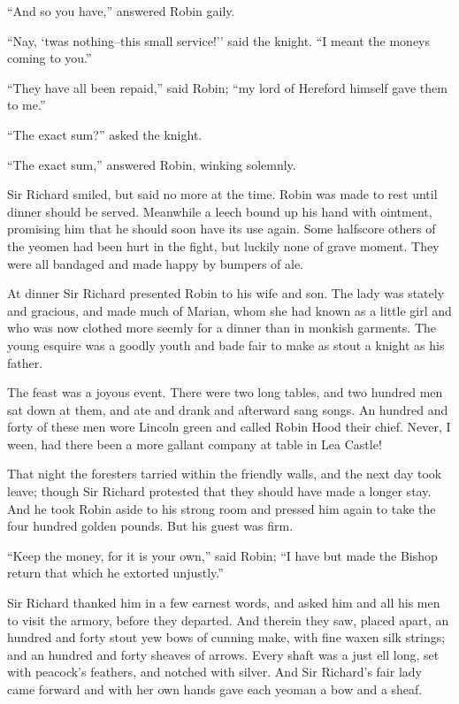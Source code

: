 ``And so you have,'' answered Robin gaily.

``Nay, `twas nothing--this small service!'' said the knight. ``I meant
the moneys coming to you.''

``They have all been repaid,'' said Robin; ``my lord of Hereford himself
gave them to me.''

``The exact sum?'' asked the knight.

``The exact sum,'' answered Robin, winking solemnly.

Sir Richard smiled, but said no more at the time. Robin was made to rest
until dinner should be served. Meanwhile a leech bound up his hand with
ointment, promising him that he should soon have its use again. Some
halfscore others of the yeomen had been hurt in the fight, but luckily
none of grave moment. They were all bandaged and made happy by bumpers
of ale.

At dinner Sir Richard presented Robin to his wife and son. The lady was
stately and gracious, and made much of Marian, whom she had known as a
little girl and who was now clothed more seemly for a dinner than in
monkish garments. The young esquire was a goodly youth and bade fair to
make as stout a knight as his father.

The feast was a joyous event. There were two long tables, and two
hundred men sat down at them, and ate and drank and afterward sang
songs. An hundred and forty of these men wore Lincoln green and called
Robin Hood their chief. Never, I ween, had there been a more gallant
company at table in Lea Castle!

That night the foresters tarried within the friendly walls, and the next
day took leave; though Sir Richard protested that they should have made
a longer stay. And he took Robin aside to his strong room and pressed
him again to take the four hundred golden pounds. But his guest was
firm.

``Keep the money, for it is your own,'' said Robin; ``I have but made
the Bishop return that which he extorted unjustly.''

Sir Richard thanked him in a few earnest words, and asked him and all
his men to visit the armory, before they departed. And therein they saw,
placed apart, an hundred and forty stout yew bows of cunning make, with
fine waxen silk strings; and an hundred and forty sheaves of arrows.
Every shaft was a just ell long, set with peacock's feathers, and
notched with silver. And Sir Richard's fair lady came forward and with
her own hands gave each yeoman a bow and a sheaf.

